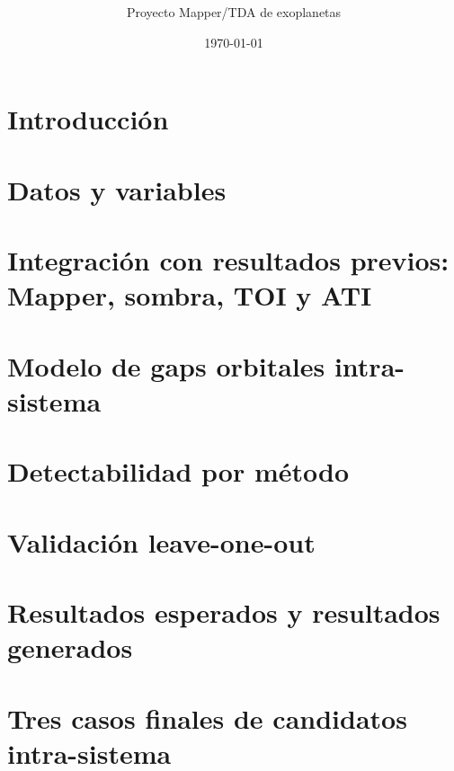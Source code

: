 \documentclass[11pt]{article}
\title{\reporttitle\\[0.4em]\large \reportsubtitle}
\author{Proyecto Mapper/TDA de exoplanetas}
\date{\today}
\begin{document}
\maketitle


\tableofcontents
\clearpage

\section{Introducci\'on}


\section{Datos y variables}


\section{Integraci\'on con resultados previos: Mapper, sombra, TOI y ATI}


\section{Modelo de gaps orbitales intra-sistema}


\section{Detectabilidad por m\'etodo}


\section{Validaci\'on leave-one-out}


\section{Resultados esperados y resultados generados}


\section{Tres casos finales de candidatos intra-sistema}

\end{document}

